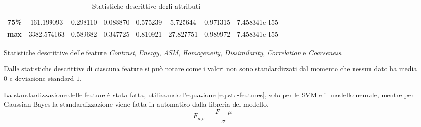 \begin{table}[h!]
\begin{subtable}[h]{1\textwidth}
{\begin{tabular}{c|c c c c c c c c}
                        \textbf{75\%}                                             & 161.199093        & 0.298110        & 0.088870     & 0.575239             & 5.725644               & 0.971315             & 7.458341e-155       \\
                        \textbf{max}                                              & 3382.574163       & 0.589682        & 0.347725     & 0.810921             & 27.827751              & 0.989972             & 7.458341e-155       \\ \hline
                  \end{tabular}}
            \caption{Statistiche descrittive delle feature \textit{Contrast}, \textit{Energy}, \textit{ASM}, \textit{Homogeneity}, \textit{Dissimilarity}, \textit{Correlation} e \textit{Coarseness}.}
            \label{tab:secondameta}
      \end{subtable}
      \caption{Statistiche descrittive degli attributi}
      \label{tab:desc-stat}
\end{table}

Dalle statistiche descrittive di ciascuna feature si può notare come i valori non
sono standardizzati dal momento che nessun dato ha media $0$ e deviazione
standard $1$.

La standardizzazione delle feature è stata fatta, utilizzando l'equazione
\ref{eq:std-features}, solo per le SVM e il modello neurale, mentre per Gaussian
Bayes la standardizzazione viene fatta in automatico dalla libreria del modello.
\begin{equation}
      F_{\mu, \sigma} = \frac{F - \mu}{\sigma}
      \label{eq:std-features}
\end{equation}

